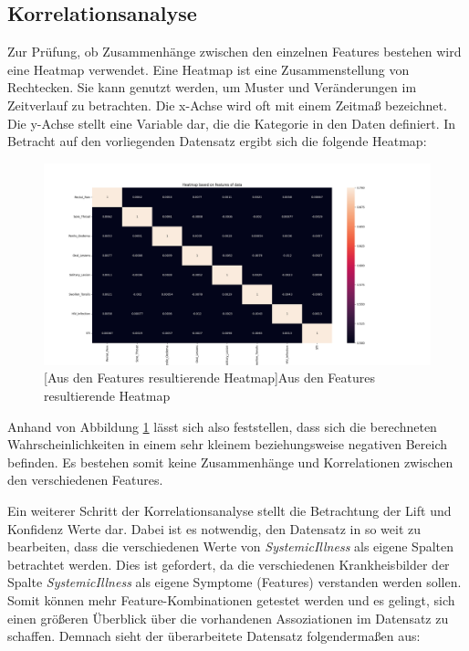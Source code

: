 \documentclass[13pt,a4paper, listof=entryprefix, bibliography=totocnumbered,toc=listofnumbered,lof=listofnumbered]{scrartcl}
\begin{document}
	\subsection{Korrelationsanalyse}
		\label{ch:korrleations_analyse}

Zur Prüfung, ob Zusammenhänge zwischen den einzelnen Features bestehen wird eine Heatmap verwendet. 
Eine Heatmap ist eine Zusammenstellung von Rechtecken. Sie kann genutzt werden, um Muster und Veränderungen im
Zeitverlauf zu betrachten. Die x-Achse wird oft mit einem Zeitmaß bezeichnet. Die y-Achse stellt eine Variable dar, 
die die Kategorie in den Daten definiert. In Betracht auf den vorliegenden Datensatz ergibt sich die folgende Heatmap:

	\begin{figure}[H]
		\centering
		\includegraphics[width=0.8\linewidth]{Bilder/heat_map.png}
		[Aus den Features resultierende Heatmap]{Aus den Features resultierende Heatmap}
		\label{fig:heatmap}
	\end{figure}
	
Anhand von Abbildung \ref{fig:heatmap} lässt sich also feststellen, dass sich die berechneten Wahrscheinlichkeiten in einem sehr kleinem beziehungsweise 
negativen Bereich befinden. Es bestehen somit keine Zusammenhänge und Korrelationen zwischen den verschiedenen Features. 

Ein weiterer Schritt der Korrelationsanalyse stellt die Betrachtung der Lift und Konfidenz Werte dar. Dabei ist es notwendig, den 
Datensatz in so weit zu bearbeiten, dass die verschiedenen Werte von \textit{Systemic\textunderscore Illness} als eigene Spalten betrachtet werden. 
Dies ist gefordert, da die verschiedenen Krankheisbilder der Spalte \textit{Systemic\textunderscore Illness} als eigene Symptome (Features) verstanden werden sollen. 
Somit können mehr Feature-Kombinationen getestet werden und es gelingt, sich einen größeren Überblick über die vorhandenen Assoziationen im Datensatz zu schaffen. 
Demnach sieht der überarbeitete Datensatz folgendermaßen aus: 
\end{document}
